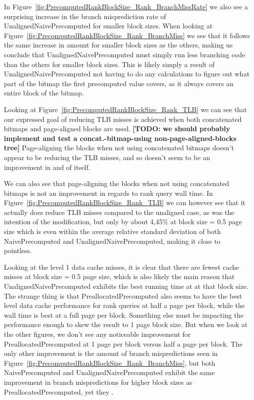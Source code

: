 In Figure~\ref{fig:PrecomputedRankBlockSize_Rank_BranchMissRate} we also see a surprising increase in the branch misprediction rate of UnalignedNaivePrecomputed for smaller block sizes.
When looking at Figure~\ref{fig:PrecomputedRankBlockSize_Rank_BranchMiss} we see that it follows the same increase in amount for smaller block sizes as the others, making us conclude that UnalignedNaivePrecomputed must simply run less branching code than the others for smaller block sizes.
This is likely simply a result of UnalignedNaivePrecomputed not having to do any calculations to figure out what part of the bitmap the first precomputed value covers, as it always covers an entire block of the bitmap.

Looking at Figure~\ref{fig:PrecomputedRankBlockSize_Rank_TLB} we can see that our expressed goal of reducing TLB misses is achieved when both concatenated bitmaps and page-aligned blocks are used. \textbf{[TODO: we should probably implement and test a concat.-bitmap-using non-page-aligned-blocks tree]}
Page-aligning the blocks when not using concatenated bitmaps doesn't appear to be reducing the TLB misses, and so doesn't seem to be an improvement in and of itself.



We can also see that page-aligning the blocks when not using concatenated bitmaps is not an improvement in regards to rank query wall time.
In Figure~\ref{fig:PrecomputedRankBlockSize_Rank_TLB} we can however see that it actually does reduce TLB misses compared to the unaligned case, as was the intention of the modification, but only by about 4,45\% at block size = 0.5 page size which is even within the average relative standard deviation of both NaivePrecomputed and UnalignedNaivePrecomputed, making it close to pointless.



Looking at the level 1 data cache misses, it is clear that there are fewest cache misses at block size = 0.5 page size, which is also likely the main reason that UnalignedNaivePrecomputed exhibits the best running time at at that block size.
The strange thing is that PreallocatedPrecomputed also seems to have the best level data cache performance for rank queries at half a page per block, while the wall time is best at a full page per block.
Something else must be impacting the performance enough to skew the result to 1 page block size.
But when we look at the other figures, we don't see any noticeable improvement for PreallocatedPrecomputed at 1 page per block versus half a page per block.
The only other improvement is the amount of branch mispredictions seen in Figure~\ref{fig:PrecomputedRankBlockSize_Rank_BranchMiss}, but both NaivePrecomputed and UnalignedNaivePrecomputed exhibit the same improvement in branch mispredictions for higher block sizes as PreallocatedPrecomputed, yet they .

